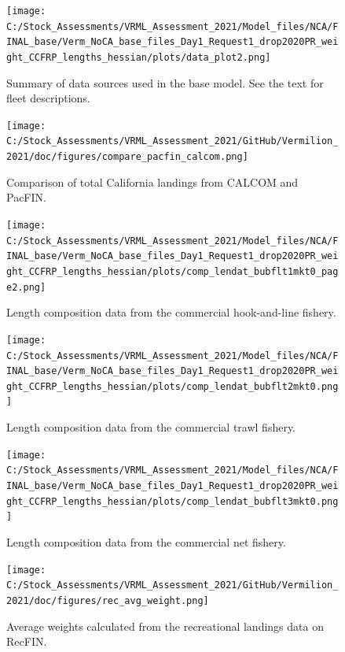 \documentclass[11pt,
  english,
]{article}
\begin{document}
\begin{figure}
\centering
\texttt{[image: C:/Stock\_Assessments/VRML\_Assessment\_2021/Model\_files/NCA/FINAL\_base/Verm\_NoCA\_base\_files\_Day1\_Request1\_drop2020PR\_weight\_CCFRP\_lengths\_hessian/plots/data\_plot2.png]}
\caption{Summary of data sources used in the base model. See the text for fleet descriptions.\label{fig:data-plot}}
\end{figure}

\begin{figure}
\centering
\texttt{[image: C:/Stock\_Assessments/VRML\_Assessment\_2021/GitHub/Vermilion\_2021/doc/figures/compare\_pacfin\_calcom.png]}
\caption{Comparison of total California landings from CALCOM and PacFIN.\label{fig:calcom-pacfin}}
\end{figure}

\FloatBarrier

\FloatBarrier

\begin{figure}
\centering
\texttt{[image: C:/Stock\_Assessments/VRML\_Assessment\_2021/Model\_files/NCA/FINAL\_base/Verm\_NoCA\_base\_files\_Day1\_Request1\_drop2020PR\_weight\_CCFRP\_lengths\_hessian/plots/comp\_lendat\_bubflt1mkt0\_page2.png]}
\caption{Length composition data from the commercial hook-and-line fishery.\label{fig:len-data-COM-HKL}}
\end{figure}

\begin{figure}
\centering
\texttt{[image: C:/Stock\_Assessments/VRML\_Assessment\_2021/Model\_files/NCA/FINAL\_base/Verm\_NoCA\_base\_files\_Day1\_Request1\_drop2020PR\_weight\_CCFRP\_lengths\_hessian/plots/comp\_lendat\_bubflt2mkt0.png]}
\caption{Length composition data from the commercial trawl fishery.\label{fig:len-data-COM-TWL}}
\end{figure}

\begin{figure}
\centering
\texttt{[image: C:/Stock\_Assessments/VRML\_Assessment\_2021/Model\_files/NCA/FINAL\_base/Verm\_NoCA\_base\_files\_Day1\_Request1\_drop2020PR\_weight\_CCFRP\_lengths\_hessian/plots/comp\_lendat\_bubflt3mkt0.png]}
\caption{Length composition data from the commercial net fishery.\label{fig:len-data-COM-NET}}
\end{figure}

\begin{figure}
\centering
\texttt{[image: C:/Stock\_Assessments/VRML\_Assessment\_2021/GitHub/Vermilion\_2021/doc/figures/rec\_avg\_weight.png]}
\caption{Average weights calculated from the recreational landings data on RecFIN.\label{fig:rec-avg-weights}}
\end{figure}
\end{document}
